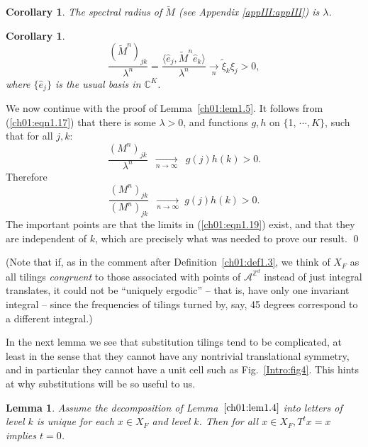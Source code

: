 \documentclass[reqno]{stml-l}
\theoremstyle{plain}
\newtheorem{lemma}[theorem]{Lemma}
\newtheorem{corollary}[theorem]{Corollary}
\theoremstyle{definition}
\numberwithin{equation}{chapter}
\begin{document}
\begin{corollary}\label{ch01:cor1.7}
The spectral radius of $\tilde{M}$ (see Appendix \ref{appIII:appIII}) \emph{is} $\lambda$.
\end{corollary}

\begin{corollary}\label{ch01:cor1.8}
\begin{equation}
\frac{(\tilde{M}^{n})_{jk}}{\lambda^{n}}=\frac{\langle\hat{e}_{j},\tilde{M}^{n}\hat{e}_{k}\rangle}{\lambda^{n}}\underset{n}{\xrightarrow{\quad}}\tilde{\xi}_{k}\xi_{j}>0,\label{ch01:eqn1.17}
\end{equation}
where $\{\hat{e}_{j}\}$ is the usual basis in $\mathbb{C}^{K}$.
\end{corollary}

We now continue with the proof of Lemma~\ref{ch01:lem1.5}. It follows from (\ref{ch01:eqn1.17}) that there is some $\lambda>0$, and functions $g,h$ on $\{$1, $\cdots,K\}$, such that for all $j,k$:
\begin{equation}\label{ch01:eqn1.18}
\frac{(M^{n})_{jk}}{\lambda^{n}}\ \underset{n\rightarrow\infty}{\xrightarrow{\qquad\qquad}}\ g(j)h(k)>0.
\end{equation}
Therefore
\begin{equation}\label{ch01:eqn1.19}
\frac{(M^{n})_{jk}}{(M^{n})_{jk}}\ \underset{n\rightarrow\infty}{\xrightarrow{\qquad\qquad}}
g(j)h(k)>0.
\end{equation}
The important points are that the limits in
(\ref{ch01:eqn1.19}) exist, and that they are independent
of $k$, which are precisely what was needed to prove our
result. \qed

(Note that if, as in the comment after Definition~\ref{ch01:def1.3}, we think of $X_{F}$ as all tilings \emph{congruent} to those associated with points of $\mathcal{A}^{\mathbb{Z}^{d}}$ instead of just integral translates, it could not be ``uniquely ergodic'' -- that is, have only one invariant integral -- since the frequencies of tilings turned by, say, 45 degrees correspond to a different integral.)

In the next lemma we see that substitution tilings tend to be complicated, at least in the sense that they cannot have any nontrivial translational symmetry, and in particular they cannot have a unit cell such as Fig.~\ref{Intro:fig4}. This hints at why substitutions will be so useful to us.

\begin{lemma}\label{ch01:lem1.9}
Assume the decomposition of Lemma~$\ref{ch01:lem1.4}$ into letters of level $k$ is unique for each $x\in X_{F}$ and level $k$. Then for all $x\in X_{F},T^{t}x=x$ implies $t=0$.
\end{lemma}
\end{document}
